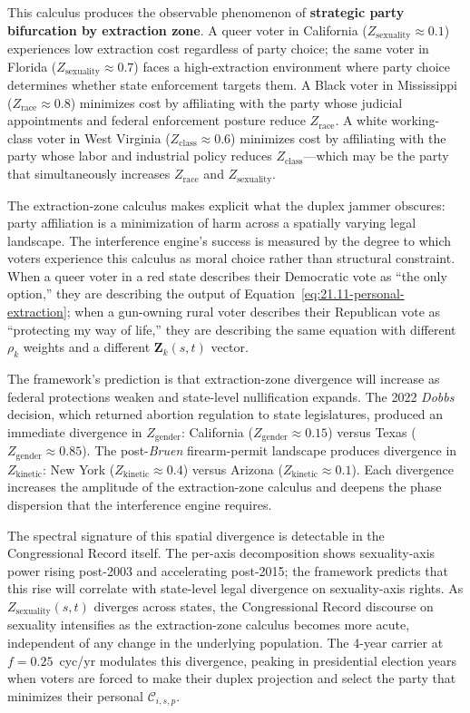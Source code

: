 This calculus produces the observable phenomenon of \textbf{strategic party bifurcation by extraction zone}. A queer voter in California ($Z_{\text{sexuality}} \approx 0.1$) experiences low extraction cost regardless of party choice; the same voter in Florida ($Z_{\text{sexuality}} \approx 0.7$) faces a high-extraction environment where party choice determines whether state enforcement targets them. A Black voter in Mississippi ($Z_{\text{race}} \approx 0.8$) minimizes cost by affiliating with the party whose judicial appointments and federal enforcement posture reduce $Z_{\text{race}}$. A white working-class voter in West Virginia ($Z_{\text{class}} \approx 0.6$) minimizes cost by affiliating with the party whose labor and industrial policy reduces $Z_{\text{class}}$---which may be the party that simultaneously increases $Z_{\text{race}}$ and $Z_{\text{sexuality}}$.

The extraction-zone calculus makes explicit what the duplex jammer obscures: party affiliation is a minimization of harm across a spatially varying legal landscape. The interference engine's success is measured by the degree to which voters experience this calculus as moral choice rather than structural constraint. When a queer voter in a red state describes their Democratic vote as ``the only option,'' they are describing the output of Equation~\ref{eq:21.11-personal-extraction}; when a gun-owning rural voter describes their Republican vote as ``protecting my way of life,'' they are describing the same equation with different $\rho_k$ weights and a different $\mathbf{Z}_k(s,t)$ vector.

The framework's prediction is that extraction-zone divergence will increase as federal protections weaken and state-level nullification expands. The 2022 \textit{Dobbs} decision, which returned abortion regulation to state legislatures, produced an immediate divergence in $Z_{\text{gender}}$: California ($Z_{\text{gender}} \approx 0.15$) versus Texas ($Z_{\text{gender}} \approx 0.85$). The post-\textit{Bruen} firearm-permit landscape produces divergence in $Z_{\text{kinetic}}$: New York ($Z_{\text{kinetic}} \approx 0.4$) versus Arizona ($Z_{\text{kinetic}} \approx 0.1$). Each divergence increases the amplitude of the extraction-zone calculus and deepens the phase dispersion that the interference engine requires.

The spectral signature of this spatial divergence is detectable in the Congressional Record itself. The per-axis decomposition shows sexuality-axis power rising post-2003 and accelerating post-2015; the framework predicts that this rise will correlate with state-level legal divergence on sexuality-axis rights. As $Z_{\text{sexuality}}(s,t)$ diverges across states, the Congressional Record discourse on sexuality intensifies as the extraction-zone calculus becomes more acute, independent of any change in the underlying population. The 4-year carrier at $f = 0.25$~cyc/yr modulates this divergence, peaking in presidential election years when voters are forced to make their duplex projection and select the party that minimizes their personal $\mathcal{C}_{i,s,p}$.

